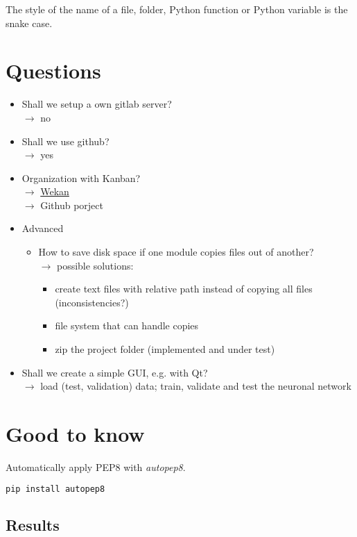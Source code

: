 \documentclass[
10pt, %
a4paper, %
onecolumn
portrait
]{article}
\begin{document}
The style of the name of a file, folder, Python function or Python variable is the snake case.


\FloatBarrier
\section{Questions}
\begin{itemize}
	\item Shall we setup a own gitlab server?\\
		  $ \rightarrow $ no
	\item Shall we use github?\\
		  $ \rightarrow $ yes
	\item Organization with Kanban?\\
		  $ \rightarrow $ \href{https://wekan.github.io/}{Wekan}\\
		  $ \rightarrow $ Github porject
	\item Advanced
	\begin{itemize}
		\item How to save disk space if one module copies files out of another?\\
			  $ \rightarrow $ possible solutions:
			  \begin{itemize}
			  	\item create text files with relative path instead of copying all files (inconsistencies?)
			  	\item file system that can handle copies
			  	\item zip the project folder (implemented and under test)
			  \end{itemize}
	\end{itemize}
	\item Shall we create a simple GUI, e.g. with Qt?\\
		  $ \rightarrow $ load (test, validation) data; train, validate and test the neuronal network
\end{itemize}

\FloatBarrier
\section{Good to know}
Automatically apply PEP8 with \textit{autopep8}.
\begin{lstlisting}[language=bash, caption={install autopep8}]
	pip install autopep8
\end{lstlisting}


\FloatBarrier
\subsection{Results}
\end{document}
